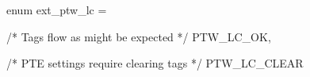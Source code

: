 enum ext_ptw_lc = {
  /* Tags flow as might be expected */
  PTW_LC_OK,

  /* PTE settings require clearing tags */
  PTW_LC_CLEAR
}
